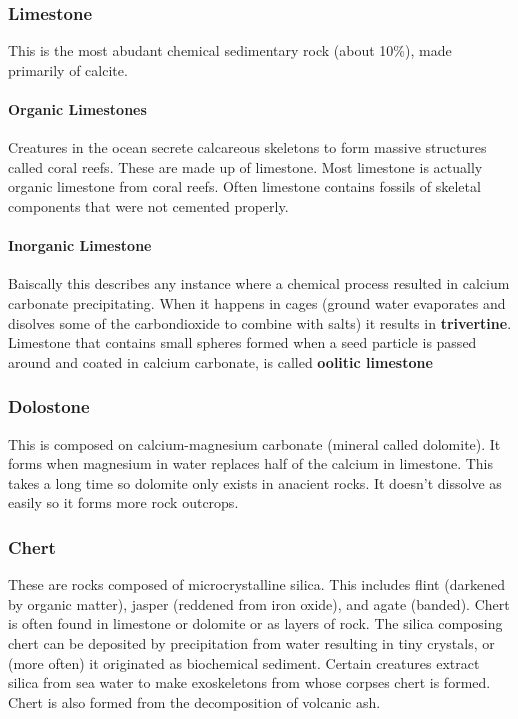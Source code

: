 \documentclass{article}
\begin{document}
\subsubsection{Limestone} %
\label{sub:limestone}
This is the most abudant chemical sedimentary rock (about 10\%), made primarily of calcite.
\paragraph{Organic Limestones} %
\label{par:organic_limestones}
Creatures in the ocean secrete calcareous skeletons to form massive structures called coral reefs. These are made up of limestone. Most limestone is actually organic limestone from coral reefs. Often limestone contains fossils of skeletal components that were not cemented properly.
\paragraph{Inorganic Limestone} %
\label{par:inorganic_limestone}
Baiscally this describes any instance where a chemical process resulted in calcium carbonate precipitating. When it happens in cages (ground water evaporates and disolves some of the carbondioxide to combine with salts) it results in \textbf{trivertine}. Limestone that contains small spheres formed when a seed particle is passed around and coated in calcium carbonate, is called \textbf{oolitic limestone}

\subsubsection{Dolostone} %
\label{sub:dolostone}
This is composed on calcium-magnesium carbonate (mineral called dolomite). It forms when magnesium in water replaces half of the calcium in limestone. This takes a long time so dolomite only exists in anacient rocks. It doesn't dissolve as easily so it forms more rock outcrops.

\subsubsection{Chert} %
\label{sub:chert}
These are rocks composed of microcrystalline silica. This includes flint (darkened by organic matter), jasper (reddened from iron oxide), and agate (banded). Chert is often found in limestone or dolomite or as layers of rock. The silica composing chert can be deposited by precipitation from water resulting in tiny crystals, or (more often) it originated as biochemical sediment. Certain creatures extract silica from sea water to make exoskeletons from whose corpses chert is formed. Chert is also formed from the decomposition of volcanic ash.
\end{document}
